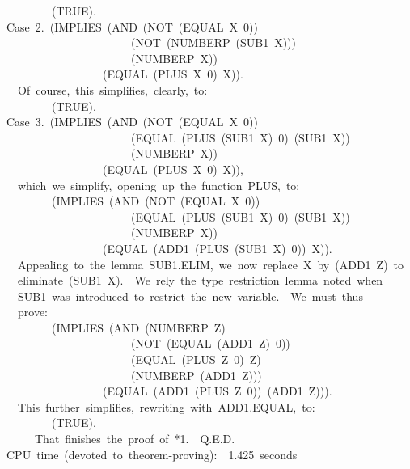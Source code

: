 \documentclass[11pt]{book}
\newenvironment{pubasis}{\begin{flushleft}\ttfamily\small}{\normalsize\rmfamily\end{flushleft}}
\begin{document}
\begin{pubasis}
~~~~~~~~(TRUE).\\

Case~2.~(IMPLIES~(AND~(NOT~(EQUAL~X~0))\\
~~~~~~~~~~~~~~~~~~~~~~(NOT~(NUMBERP~(SUB1~X)))\\
~~~~~~~~~~~~~~~~~~~~~~(NUMBERP~X))\\
~~~~~~~~~~~~~~~~~(EQUAL~(PLUS~X~0)~X)).\\

~~Of~course,~this~simplifies,~clearly,~to:\\

~~~~~~~~(TRUE).\\

Case~3.~(IMPLIES~(AND~(NOT~(EQUAL~X~0))\\
~~~~~~~~~~~~~~~~~~~~~~(EQUAL~(PLUS~(SUB1~X)~0)~(SUB1~X))\\
~~~~~~~~~~~~~~~~~~~~~~(NUMBERP~X))\\
~~~~~~~~~~~~~~~~~(EQUAL~(PLUS~X~0)~X)),\\

~~which~we~simplify,~opening~up~the~function~PLUS,~to:\\

~~~~~~~~(IMPLIES~(AND~(NOT~(EQUAL~X~0))\\
~~~~~~~~~~~~~~~~~~~~~~(EQUAL~(PLUS~(SUB1~X)~0)~(SUB1~X))\\
~~~~~~~~~~~~~~~~~~~~~~(NUMBERP~X))\\
~~~~~~~~~~~~~~~~~(EQUAL~(ADD1~(PLUS~(SUB1~X)~0))~X)).\\

~~Appealing~to~the~lemma~SUB1.ELIM,~we~now~replace~X~by~(ADD1~Z)~to\\
~~eliminate~(SUB1~X).~~We~rely~the~type~restriction~lemma~noted~when\\
~~SUB1~was~introduced~to~restrict~the~new~variable.~~We~must~thus\\
~~prove:\\

~~~~~~~~(IMPLIES~(AND~(NUMBERP~Z)\\
~~~~~~~~~~~~~~~~~~~~~~(NOT~(EQUAL~(ADD1~Z)~0))\\
~~~~~~~~~~~~~~~~~~~~~~(EQUAL~(PLUS~Z~0)~Z)\\
~~~~~~~~~~~~~~~~~~~~~~(NUMBERP~(ADD1~Z)))\\
~~~~~~~~~~~~~~~~~(EQUAL~(ADD1~(PLUS~Z~0))~(ADD1~Z))).\\

~~This~further~simplifies,~rewriting~with~ADD1.EQUAL,~to:\\

~~~~~~~~(TRUE).\\

~~~~~That~finishes~the~proof~of~*1.~~Q.E.D.\\

CPU~time~(devoted~to~theorem-proving):~~1.425~seconds\\
\end{pubasis}
\end{document}
